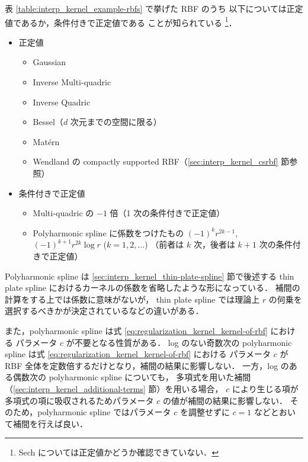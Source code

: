 表 \ref{table:interp_kernel_example-rbfs} で挙げた RBF のうち
以下については正定値であるか，条件付きで正定値である
ことが知られている\cite{Fasshauer2007,Fornberg2015}%
\footnote{Sech については正定値かどうか確認できていない．}．
\begin{itemize}
    \item 正定値
          \begin{itemize}
              \item Gaussian
              \item Inverse Multi-quadric
              \item Inverse Quadric
              \item Bessel（$d$ 次元までの空間に限る）
              \item Matérn
              \item Wendland の compactly supported RBF（\ref{sec:interp_kernel_csrbf} 節参照）
          \end{itemize}
    \item 条件付きで正定値
          \begin{itemize}
              \item Multi-quadric の $-1$ 倍（1 次の条件付きで正定値）
              \item Polyharmonic spline に係数をつけたもの $(-1)^{k} r^{2k-1}$, $(-1)^{k+1} r^{2k} \log{r}$ ($k=1,2,\ldots$)
                    （前者は $k$ 次，後者は $k+1$ 次の条件付きで正定値）
          \end{itemize}
\end{itemize}

Polyharmonic spline
は
\ref{sec:interp_kernel_thin-plate-spline} 節で後述する
thin plate spline
におけるカーネルの係数を省略したような形になっている．
補間の計算をする上では係数に意味がないが，
thin plate spline では理論上 $r$ の何乗を選択するべきかが決定されているなどの違いがある．

また，polyharmonic spline は式 \eqref{eq:regularization_kernel_kernel-of-rbf} における
パラメータ $c$ が不要となる性質がある．
log のない奇数次の polyharmonic spline は式 \eqref{eq:regularization_kernel_kernel-of-rbf} における
パラメータ $c$ が RBF 全体を定数倍するだけとなり，補間の結果に影響しない．
一方，log のある偶数次の polyharmonic spline についても，
多項式を用いた補間（\ref{sec:interp_kernel_additional-terms} 節）を用いる場合，
$c$ により生じる項が多項式の項に吸収されるためパラメータ $c$ の値が補間の結果に影響しない．
そのため，polyharmonic spline ではパラメータ $c$ を調整せずに $c=1$ などとおいて補間を行えば良い．

